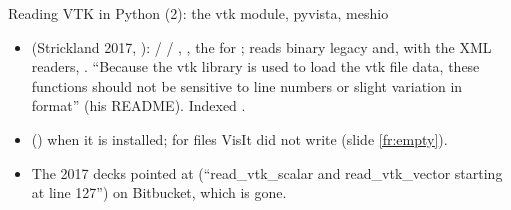 \documentclass[aspectratio=169,11pt]{beamer}
\begin{document}
\begin{frame}{Reading VTK in Python (2): the vtk module, pyvista, meshio}
\label{fr:vtkpy2}
\footnotesize
\begin{itemize}
  \item {} (Strickland 2017, ):  /  / , , the  for ; reads binary legacy and, with the XML readers, . ``Because the vtk library is used to load the vtk file data, these functions should not be sensitive to line numbers or slight variation in format'' (his README). Indexed \code{[z, y, x]}.
  \item {} () when it is installed;  for files VisIt did not write (slide \ref{fr:empty}).
  \item The 2017 decks pointed at  (``read\_vtk\_scalar and read\_vtk\_vector starting at line 127'') on Bitbucket, which is gone.
\end{itemize}
\end{frame}
\end{document}
